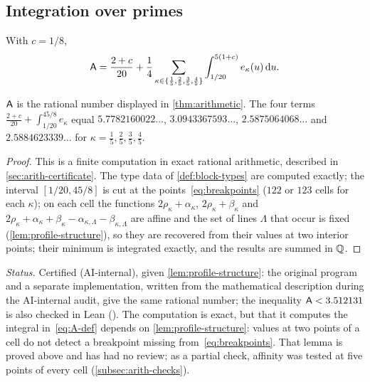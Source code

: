 \subsection{Integration over primes}\label{subsec:integration}

\begin{definition}\label{def:A}
With $c=1/8$,
\begin{equation}\label{eq:A-def}
  \mathsf{A}=\frac{2+c}{20}+\frac14\sum_{\kappa\in\{\frac15,\frac25,\frac35,\frac45\}}
      \int_{1/20}^{5(1+c)}e_\kappa(u)\,\mathrm{d} u .
\end{equation}
\end{definition}

\begin{proposition}\label{prop:A-value}
$\mathsf{A}$ is the rational number displayed in \cref{thm:arithmetic}. The four terms
$\frac{2+c}{20}+\int_{1/20}^{45/8}e_\kappa$ equal $5.7782160022\ldots$, $3.0943367593\ldots$,
$2.5875064068\ldots$ and $2.5884623339\ldots$ for $\kappa=\frac15,\frac25,\frac35,\frac45$.
\end{proposition}

\begin{proof}
This is a finite computation in exact rational arithmetic, described in
\cref{sec:arith-certificate}. The type data of \cref{def:block-types} are computed exactly; the
interval $[1/20,45/8]$ is cut at the points~\eqref{eq:breakpoints} ($122$ or $123$ cells for each
$\kappa$); on each cell the functions $2\rho_\kappa+\alpha_\kappa$, $2\rho_\kappa+\beta_\kappa$ and
$2\rho_\kappa+\alpha_\kappa+\beta_\kappa-\alpha_{\kappa,\Lambda}-\beta_{\kappa,\Lambda}$ are affine
and the set of lines $\Lambda$ that occur is fixed (\cref{lem:profile-structure}), so they are
recovered from their values at two interior points; their minimum is integrated exactly, and the
results are summed in $\mathbb{Q}$.
\end{proof}

\emph{Status.} Certified (AI-internal), given \cref{lem:profile-structure}: the original program
and a separate implementation, written from the mathematical description during the AI-internal
audit, give the same rational number; the inequality $\mathsf{A}<3.512131$ is also checked in Lean
(). The computation is exact, but that it computes the integral
in~\eqref{eq:A-def} depends on \cref{lem:profile-structure}: values at two points of a cell do not
detect a breakpoint missing from~\eqref{eq:breakpoints}. That lemma is proved above and has had no
review; as a partial check, affinity was tested at five points of every cell
(\cref{subsec:arith-checks}).

